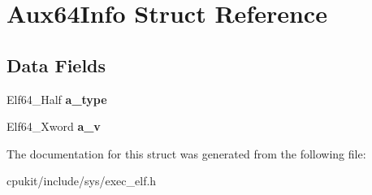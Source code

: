 \hypertarget{structAux64Info}{}\section{Aux64\+Info Struct Reference}
\label{structAux64Info}
\subsection*{Data Fields}
\begin{DoxyCompactItemize}
\item 
\mbox{\label{structAux64Info_ab67d88cab683ab04183fadb1035736ea}} 
Elf64\+\_\+\+Half {\bfseries a\+\_\+type}
\item 
\mbox{\label{structAux64Info_a3f5e9258f9e35414fd01d402a9f150f2}} 
Elf64\+\_\+\+Xword {\bfseries a\+\_\+v}
\end{DoxyCompactItemize}


The documentation for this struct was generated from the following file\+:\begin{DoxyCompactItemize}
\item 
cpukit/include/sys/exec\+\_\+elf.\+h\end{DoxyCompactItemize}
